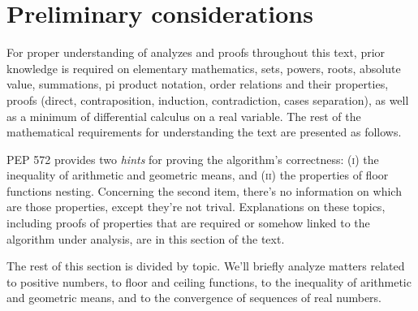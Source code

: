 \section*{Preliminary considerations}

For proper understanding
of analyzes and proofs throughout this text,
prior knowledge is required on elementary mathematics, sets,
powers, roots, absolute value, summations, pi product notation,
order relations and their properties,
proofs (direct, contraposition, induction, contradiction,
        cases separation),
as well as a minimum of differential calculus on a real variable.
The rest of the mathematical requirements for understanding the text
are presented as follows.

PEP 572 provides two \emph{hints}
for proving the algorithm's correctness:
\textsc{(i)} the inequality of arithmetic and geometric means,
and \textsc{(ii)} the properties of floor functions nesting.
Concerning the second item,
there's no information on which are those properties,
except they're not trival.
Explanations on these topics,
including proofs of properties that are required
or somehow linked to the algorithm under analysis,
are in this section of the text.

The rest of this section is divided by topic.
We'll briefly analyze matters related
to positive numbers,
to floor and ceiling functions,
to the inequality of arithmetic and geometric means,
and to the convergence of sequences of real numbers.
